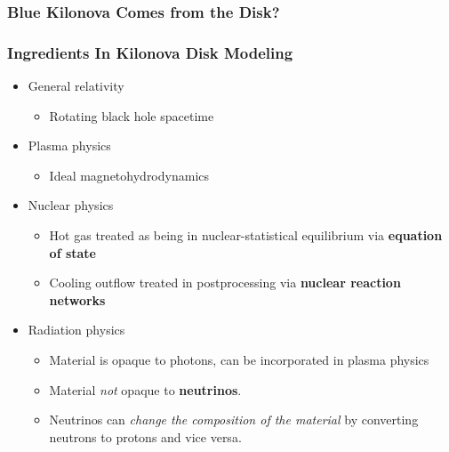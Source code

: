 \documentclass[]{beamer}
\begin{document}

\begin{frame}
  \frametitle{Blue Kilonova Comes from the Disk?}
  \begin{center}
  \end{center}
\end{frame}


\begin{frame}
  \frametitle{Ingredients In Kilonova Disk Modeling}
  \begin{itemize}
  \item General relativity
    \begin{itemize}
    \item Rotating black hole spacetime
    \end{itemize}
  \item Plasma physics
    \begin{itemize}
    \item Ideal magnetohydrodynamics
    \end{itemize}
  \item Nuclear physics
    \begin{itemize}
    \item Hot gas treated as being in nuclear-statistical equilibrium via \textbf{equation of state}
    \item Cooling outflow treated in postprocessing via \textbf{nuclear reaction networks}
    \end{itemize}
  \item Radiation physics
    \begin{itemize}
    \item Material is opaque to photons, can be incorporated in plasma physics
    \item Material \textit{not} opaque to \textbf{neutrinos}.
    \item Neutrinos can \textit{change the composition of the
        material} by converting neutrons to protons and vice versa.
    \end{itemize}
  \end{itemize}
\end{frame}
\end{document}
